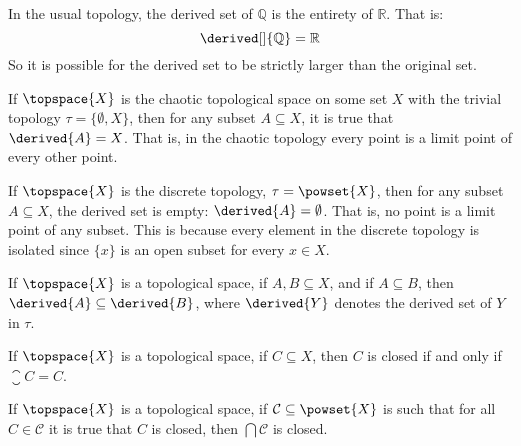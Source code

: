 \documentclass{book}                                                           %
\begin{document}
            \begin{example}
                In the usual topology, the derived set of $\mathbb{Q}$ is the
                entirety of $\mathbb{R}$. That is:
                \begin{equation}
                    \derived[]{\mathbb{Q}}=\mathbb{R}
                \end{equation}
                So it is possible for the derived set to be strictly larger than the
                original set.
            \end{example}
            \begin{example}
                If $\topspace{X}$ is the chaotic topological space on some set $X$
                with the trivial topology $\tau=\{\emptyset,X\}$, then for any
                subset $A\subseteq{X}$, it is true that $\derived{A}=X$. That is,
                in the chaotic topology every point is a limit point of every other
                point.
            \end{example}
            \begin{example}
                If $\topspace{X}$ is the discrete topology, $\tau=\powset{X}$, then
                for any subset $A\subseteq{X}$, the derived set is empty:
                $\derived{A}=\emptyset$. That is, no point is a limit point of any
                subset. This is because every element in the discrete topology is
                isolated since $\{x\}$ is an open subset for every $x\in{X}$.
            \end{example}
            \begin{theorem}
                If $\topspace{X}$ is a topological space, if $A,B\subseteq{X}$, and
                if $A\subseteq{B}$, then $\derived{A}\subseteq\derived{B}$, where
                $\derived{Y}$ denotes the derived set of $Y$ in $\tau$.
            \end{theorem}
            \begin{theorem}
                If $\topspace{X}$ is a topological space, if $C\subseteq{X}$, then
                $C$ is closed if and only if $\closure{C}=C$.
            \end{theorem}
            \begin{theorem}
                If $\topspace{X}$ is a topological space, if
                $\mathcal{C}\subseteq\powset{X}$ is such that for all
                $C\in\mathcal{C}$ it is true that $C$ is closed, then
                $\bigcap\mathcal{C}$ is closed.
            \end{theorem}
\end{document}
